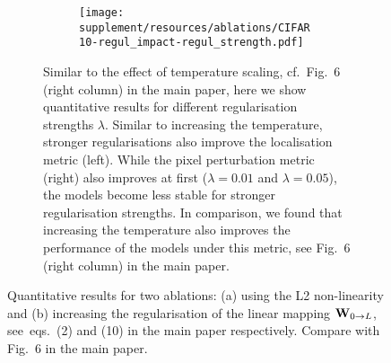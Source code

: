 \begin{figure}
\begin{subfigure}[c]{\textwidth}
    \begin{subfigure}[c]{0.45\textwidth}
    \centering
    \texttt{[image: supplement/resources/ablations/CIFAR10-regul\_impact-regul\_strength.pdf]}
    \end{subfigure}
    \caption{Similar to the effect of temperature scaling, cf.~Fig.~6 (right column) in the main paper, here we show quantitative results for different regularisation strengths $\lambda$. Similar to increasing the temperature, stronger regularisations also improve the localisation metric (left). While the pixel perturbation metric (right) also improves at first ($\lambda = 0.01$ and $\lambda = 0.05$), the models become less stable for stronger regularisation strengths. In comparison, we found that increasing the temperature also improves the performance of the models under this metric, see Fig.~6 (right column) in the main paper.}
    \label{fig:regul_ablation}
    \vspace{.75em}
    \end{subfigure}
    \caption{Quantitative results for two ablations: (a) using the L2 non-linearity and (b) increasing the regularisation of the linear mapping $\mat W_{0\rightarrow L}$, see~eqs.~(2) and (10) in the main paper respectively. Compare with Fig.~6 in the main paper.}
\end{figure}
